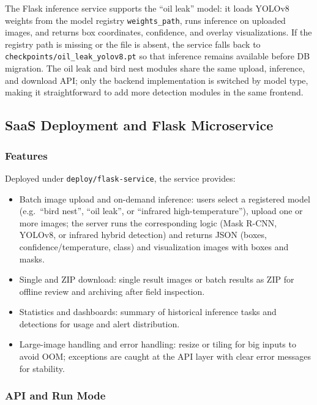 \documentclass[12pt,a4paper]{article}
\begin{document}
The Flask inference service supports the ``oil leak'' model: it loads YOLOv8 weights from the model registry \texttt{weights\_path}, runs inference on uploaded images, and returns box coordinates, confidence, and overlay visualizations. If the registry path is missing or the file is absent, the service falls back to \texttt{checkpoints/oil\_leak\_yolov8.pt} so that inference remains available before DB migration. The oil leak and bird nest modules share the same upload, inference, and download API; only the backend implementation is switched by model type, making it straightforward to add more detection modules in the same frontend.

\subsection{SaaS Deployment and Flask Microservice}

\subsubsection{Features}

Deployed under \texttt{deploy/flask-service}, the service provides:

\begin{itemize}
  \item Batch image upload and on-demand inference: users select a registered model (e.g.\ ``bird nest'', ``oil leak'', or ``infrared high-temperature''), upload one or more images; the server runs the corresponding logic (Mask R-CNN, YOLOv8, or infrared hybrid detection) and returns JSON (boxes, confidence/temperature, class) and visualization images with boxes and masks.
  \item Single and ZIP download: single result images or batch results as ZIP for offline review and archiving after field inspection.
  \item Statistics and dashboards: summary of historical inference tasks and detections for usage and alert distribution.
  \item Large-image handling and error handling: resize or tiling for big inputs to avoid OOM; exceptions are caught at the API layer with clear error messages for stability.
\end{itemize}

\subsubsection{API and Run Mode}
\end{document}

